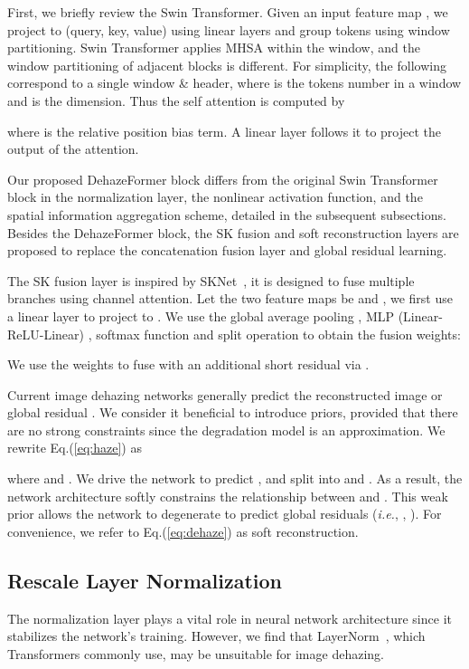 \documentclass[journal]{IEEEtran}
\begin{document}
First, we briefly review the Swin Transformer.
Given an input feature map , we project  to  (query, key, value) using linear layers and group tokens using window partitioning.
Swin Transformer applies MHSA within the window, and the window partitioning of adjacent blocks is different.
For simplicity, the following  correspond to a single window \& header, where  is the tokens number in a window and  is the dimension.
Thus the self attention is computed by

where  is the relative position bias term.
A linear layer follows it to project the output of the attention.

Our proposed DehazeFormer block differs from the original Swin Transformer block in the normalization layer, the nonlinear activation function, and the spatial information aggregation scheme, detailed in the subsequent subsections.
Besides the DehazeFormer block, the SK fusion and soft reconstruction layers are proposed to replace the concatenation fusion layer and global residual learning.

The SK fusion layer is inspired by SKNet~\cite{li2019selective}, it is designed to fuse multiple branches using channel attention.
Let the two feature maps be  and , we first use a linear layer  to project  to .
We use the global average pooling , MLP (Linear-ReLU-Linear) , softmax function and split operation to obtain the fusion weights:

We use the weights  to fuse  with an additional short residual via .

Current image dehazing networks generally predict the reconstructed image  or global residual .
We consider it beneficial to introduce priors, provided that there are no strong constraints since the degradation model is an approximation.
We rewrite Eq.(\ref{eq:haze}) as

where  and .
We drive the network to predict , and split  into  and .
As a result, the network architecture softly constrains the relationship between  and .
This weak prior allows the network to degenerate to predict global residuals (\emph{i.e.}, , ).
For convenience, we refer to Eq.(\ref{eq:dehaze}) as soft reconstruction.

\subsection{Rescale Layer Normalization}

The normalization layer plays a vital role in neural network architecture since it stabilizes the network's training.
However, we find that LayerNorm~\cite{ba2016layer}, which Transformers commonly use, may be unsuitable for image dehazing.
\end{document}
